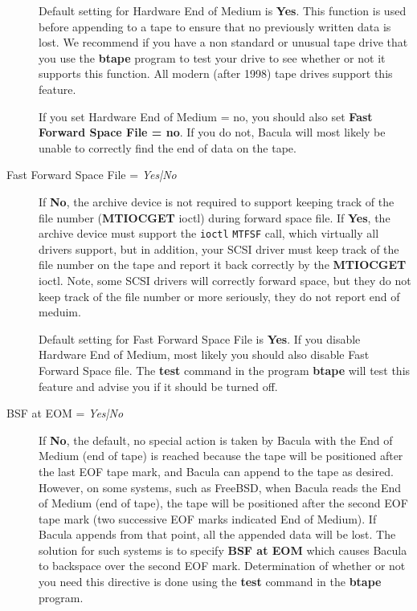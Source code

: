 \begin{description}
Default setting for Hardware End of Medium is {\bf Yes}. This  function is
used before appending to a tape to ensure that no  previously written data is
lost. We recommend if you have a non  standard or unusual tape drive that you
use the {\bf btape} program  to test your drive to see whether or not it
supports this function.  All modern (after 1998) tape drives support this
feature.  

If you set Hardware End of Medium = no, you should also set  {\bf Fast Forward
Space File = no}. If you do not, Bacula will  most likely be unable to
correctly find the end of data on the  tape.  

\item [Fast Forward Space File = {\it Yes|No}]
   If {\bf No}, the archive device is not required to support  keeping track of
the file number ({\bf MTIOCGET} ioctl) during  forward space file. If {\bf
Yes}, the archive device must support  the {\tt ioctl} {\tt MTFSF} call, which
virtually all drivers  support, but in addition, your SCSI driver must keep
track of the  file number on the tape and report it back correctly by the 
{\bf MTIOCGET} ioctl. Note, some SCSI drivers will correctly  forward space,
but they do not keep track of the file number or more  seriously, they do not
report end of meduim.  

Default setting for Fast Forward Space File is {\bf Yes}. If  you disable
Hardware End of Medium, most likely you should also  disable Fast Forward
Space file. The {\bf test} command in the  program {\bf btape} will test this
feature and advise you if  it should be turned off.  

\item [BSF at EOM = {\it Yes|No}]
   If {\bf No}, the default, no special action is taken by  Bacula with the End
of Medium (end of tape) is reached because  the tape will be positioned after
the last EOF tape mark, and  Bacula can append to the tape as desired.
However, on some  systems, such as FreeBSD, when Bacula reads the End of
Medium  (end of tape), the tape will be positioned after the second  EOF tape
mark (two successive EOF marks indicated End of  Medium). If Bacula appends
from that point, all the appended  data will be lost. The solution for such
systems is to  specify {\bf BSF at EOM} which causes Bacula to backspace  over
the second EOF mark. Determination of whether or not  you need this directive
is done using the {\bf test} command  in the {\bf btape} program.


\end{description}
